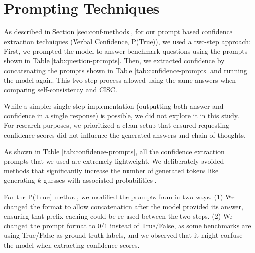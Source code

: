 
\section{Prompting Techniques}
\label{sec:appendix-prompting}

As described in Section \ref{sec:conf-methods}, for our prompt based confidence extraction techniques (Verbal Confidence, P(True)), we used a two-step approach: First, we prompted the model to answer benchmark questions using the prompts shown in Table \ref{tab:question-prompts}. Then, we extracted confidence by concatenating the prompts shown in Table \ref{tab:confidence-prompts} and running the model again. This two-step process allowed using the same answers when comparing self-consistency and CISC.

While a simpler single-step implementation (outputting both answer and confidence in a single response) is possible, we did not explore it in this study. For research purposes, we prioritized a clean setup that ensured requesting confidence scores did not influence the generated answers and chain-of-thoughts.

As shown in Table \ref{tab:confidence-prompts}, all the confidence extraction prompts that we used are extremely lightweight. We deliberately avoided methods that significantly increase the number of generated tokens like generating $k$ guesses with associated probabilities \cite{tian2023just}. 

For the P(True) method, we modified the prompts from \citet{kadavath2022language} in two ways: (1) We changed the format to allow concatenation after the model provided its answer, ensuring that prefix caching could be re-used between the two steps. (2) We changed the prompt format to 0/1 instead of True/False, as some benchmarks are using True/False as ground truth labels, and we observed that it might confuse the model when extracting confidence scores.

